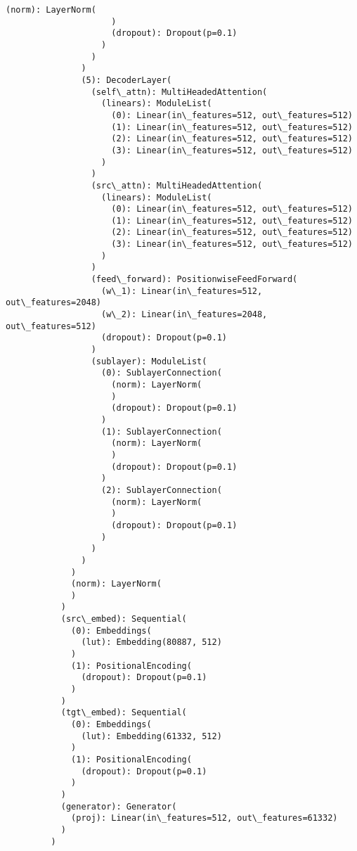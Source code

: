 \documentclass[11pt]{article}
\begin{document}
\begin{Verbatim}[commandchars=\\\{\}]
                     (norm): LayerNorm(
                     )
                     (dropout): Dropout(p=0.1)
                   )
                 )
               )
               (5): DecoderLayer(
                 (self\_attn): MultiHeadedAttention(
                   (linears): ModuleList(
                     (0): Linear(in\_features=512, out\_features=512)
                     (1): Linear(in\_features=512, out\_features=512)
                     (2): Linear(in\_features=512, out\_features=512)
                     (3): Linear(in\_features=512, out\_features=512)
                   )
                 )
                 (src\_attn): MultiHeadedAttention(
                   (linears): ModuleList(
                     (0): Linear(in\_features=512, out\_features=512)
                     (1): Linear(in\_features=512, out\_features=512)
                     (2): Linear(in\_features=512, out\_features=512)
                     (3): Linear(in\_features=512, out\_features=512)
                   )
                 )
                 (feed\_forward): PositionwiseFeedForward(
                   (w\_1): Linear(in\_features=512, out\_features=2048)
                   (w\_2): Linear(in\_features=2048, out\_features=512)
                   (dropout): Dropout(p=0.1)
                 )
                 (sublayer): ModuleList(
                   (0): SublayerConnection(
                     (norm): LayerNorm(
                     )
                     (dropout): Dropout(p=0.1)
                   )
                   (1): SublayerConnection(
                     (norm): LayerNorm(
                     )
                     (dropout): Dropout(p=0.1)
                   )
                   (2): SublayerConnection(
                     (norm): LayerNorm(
                     )
                     (dropout): Dropout(p=0.1)
                   )
                 )
               )
             )
             (norm): LayerNorm(
             )
           )
           (src\_embed): Sequential(
             (0): Embeddings(
               (lut): Embedding(80887, 512)
             )
             (1): PositionalEncoding(
               (dropout): Dropout(p=0.1)
             )
           )
           (tgt\_embed): Sequential(
             (0): Embeddings(
               (lut): Embedding(61332, 512)
             )
             (1): PositionalEncoding(
               (dropout): Dropout(p=0.1)
             )
           )
           (generator): Generator(
             (proj): Linear(in\_features=512, out\_features=61332)
           )
         )
\end{Verbatim}
            
\end{document}
